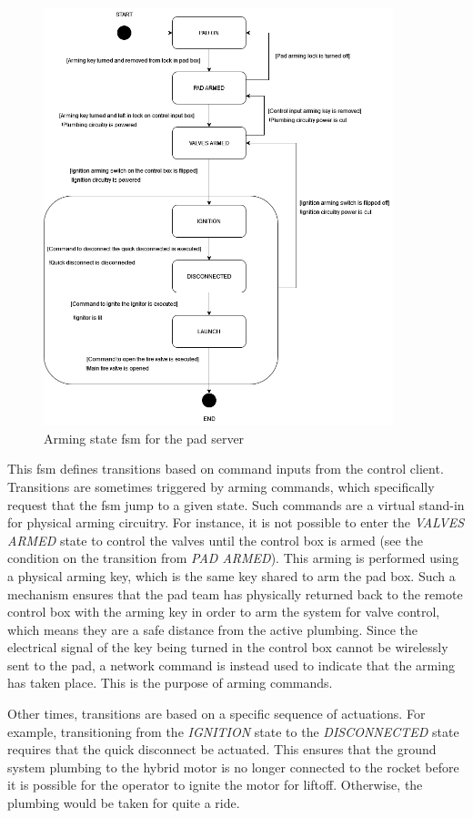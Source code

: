 \begin{figure}[H]
    \center
    \includegraphics[width=4in]{assets/diagrams/Hybrid_Control_FSM.png}
    \caption{Arming state \gls{fsm} for the pad server}
    \label{fig:arming-fsm}
\end{figure}

This \gls{fsm} defines transitions based on command inputs from the control client. Transitions are sometimes triggered
by arming commands, which specifically request that the \gls{fsm} jump to a given state. Such commands are a virtual
stand-in for physical arming circuitry. For instance, it is not possible to enter the \textit{VALVES ARMED} state to
control the valves until the control box is armed (see the condition on the transition from \textit{PAD ARMED}). This
arming is performed using a physical arming key, which is the same key shared to arm the pad box. Such a mechanism
ensures that the pad team has physically returned back to the remote control box with the arming key in order to arm
the system for valve control, which means they are a safe distance from the active plumbing. Since the electrical
signal of the key being turned in the control box cannot be wirelessly sent to the pad, a network command is instead
used to indicate that the arming has taken place. This is the purpose of arming commands.

Other times, transitions are based on a specific sequence of actuations. For example, transitioning from the
\textit{IGNITION} state to the \textit{DISCONNECTED} state requires that the quick disconnect be actuated. This ensures
that the ground system plumbing to the hybrid motor is no longer connected to the rocket before it is possible for the
operator to ignite the motor for liftoff. Otherwise, the plumbing would be taken for quite a ride.

